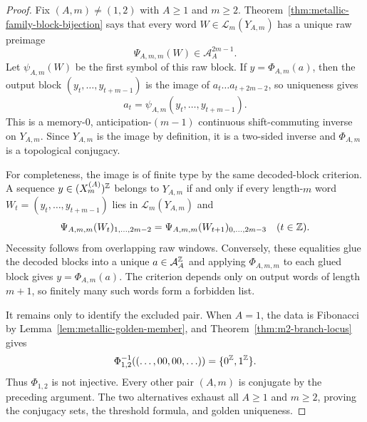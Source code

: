 \begin{proof}
Fix $(A,m)\ne(1,2)$ with $A\ge1$ and $m\ge2$.
Theorem~\ref{thm:metallic-family-block-bijection} says that every word
$W\in\mathcal L_m(Y_{A,m})$ has a unique raw preimage
\[
\Psi_{A,m,m}(W)\in\mathcal A_A^{2m-1}.
\]
Let $\psi_{A,m}(W)$ be the first symbol of this raw block.  If
$y=\Phi_{A,m}(a)$, then the output block
$(y_t,\ldots,y_{t+m-1})$ is the image of
$a_t\ldots a_{t+2m-2}$, so uniqueness gives
\[
a_t=\psi_{A,m}(y_t,\ldots,y_{t+m-1}).
\]
This is a memory-$0$, anticipation-$(m-1)$ continuous shift-commuting inverse
on $Y_{A,m}$.  Since $Y_{A,m}$ is the image by definition, it is a two-sided
inverse and $\Phi_{A,m}$ is a topological conjugacy.

For completeness, the image is of finite type by the same decoded-block
criterion.  A sequence $y\in(X_m^{(A)})^{\mathbb{Z}}$ belongs to $Y_{A,m}$ if and
only if every length-$m$ word
$W_t=(y_t,\ldots,y_{t+m-1})$ lies in $\mathcal L_m(Y_{A,m})$ and
\[
\Psi_{A,m,m}(W_t)_{1,\ldots,2m-2}
=\Psi_{A,m,m}(W_{t+1})_{0,\ldots,2m-3}
\quad(t\in\mathbb{Z}).
\]
Necessity follows from overlapping raw windows.  Conversely, these equalities
glue the decoded blocks into a unique $a\in\mathcal A_A^{\mathbb{Z}}$ and applying
$\Phi_{A,m,m}$ to each glued block gives $y=\Phi_{A,m}(a)$.  The criterion
depends only on output words of length $m+1$, so finitely many such words form
a forbidden list.

It remains only to identify the excluded pair.  When $A=1$, the data is
Fibonacci by Lemma~\ref{lem:metallic-golden-member}, and
Theorem~\ref{thm:m2-branch-locus} gives
\[
\Phi_{1,2}^{-1}((\ldots,00,00,\ldots))=\{0^{\mathbb{Z}},1^{\mathbb{Z}}\}.
\]
Thus $\Phi_{1,2}$ is not injective.  Every other pair $(A,m)$ is conjugate by
the preceding argument.  The two alternatives exhaust all $A\ge1$ and
$m\ge2$, proving the conjugacy sets, the threshold formula, and golden
uniqueness.
\end{proof}

